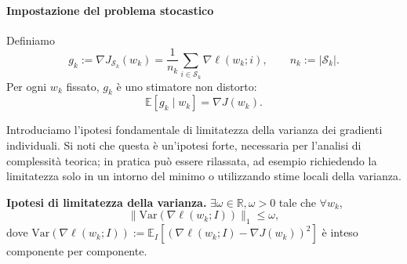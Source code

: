 \documentclass[a4paper,12pt]{article}
\numberwithin{equation}{section}
\numberwithin{figure}{section}
\numberwithin{table}{section}
\begin{document}
\paragraph{Impostazione del problema stocastico}

Definiamo
\[
g_k := \nabla J_{\mathcal{S}_k}(w_k) = \frac{1}{n_k}\sum_{i\in \mathcal{S}_k}\nabla \ell(w_k;i), \qquad n_k := |\mathcal{S}_k|. \tag{5.2}
\]
Per ogni \(w_k\) fissato, \(g_k\) è uno stimatore non distorto:
\[
\mathbb{E}[g_k \mid w_k] = \nabla J(w_k). \tag{5.3}
\]

Introduciamo l'ipotesi fondamentale di limitatezza della varianza dei gradienti individuali. Si noti che questa \`e un'ipotesi forte, necessaria per l'analisi di complessit\`a teorica; in pratica pu\`o essere rilassata, ad esempio richiedendo la limitatezza solo in un intorno del minimo o utilizzando stime locali della varianza.

\begin{notebox}
  \textbf{Ipotesi di limitatezza della varianza.}
   \(\exists \omega \in \mathbb{R},\omega > 0\) tale che \(\forall w_k\),
  \[
  \|\mathrm{Var}(\nabla \ell(w_k;I))\|_1 \le \omega, \tag{5.4}\label{eq:var_bound}
  \]
  dove \(\mathrm{Var}(\nabla \ell(w_k;I)) := \mathbb{E}_I[(\nabla \ell(w_k;I) - \nabla J(w_k))^2]\) è inteso componente per componente.
\end{notebox}
\end{document}
